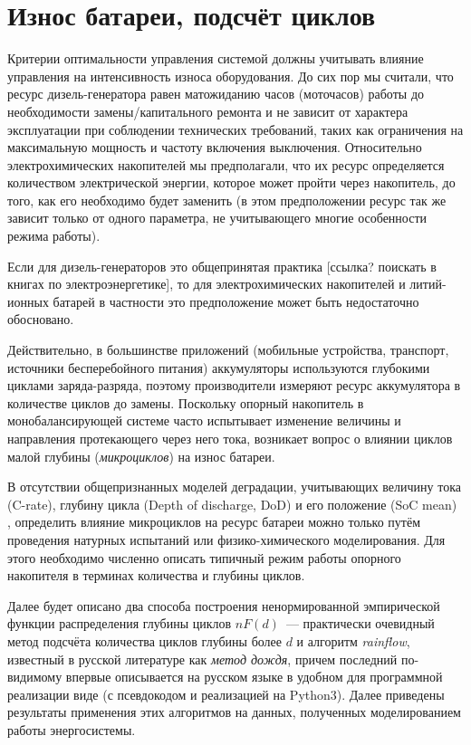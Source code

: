 \documentclass{report}
\begin{document}
\section{Износ батареи, подсчёт циклов}

Критерии оптимальности управления системой должны учитывать влияние управления на интенсивность износа оборудования.
До сих пор мы считали, что ресурс дизель-генератора равен матожиданию часов (моточасов) работы до необходимости замены/капитального ремонта и не зависит от характера эксплуатации при соблюдении технических требований, таких как ограничения на максимальную мощность и частоту включения выключения.
Относительно электрохимических накопителей мы предполагали, что их ресурс определяется количеством электрической энергии, которое может пройти через накопитель, до того, как его необходимо будет заменить (в этом предположении ресурс так же зависит только от одного параметра, не учитывающего многие особенности режима работы).

Если для дизель-генераторов это общепринятая практика [ссылка? поискать в книгах по электроэнергетике], то для электрохимических накопителей и литий-ионных батарей в частности это предположение может быть недостаточно обосновано.

Действительно, в большинстве приложений (мобильные устройства, транспорт, источники бесперебойного питания) аккумуляторы используются глубокими циклами заряда-разряда, поэтому производители измеряют ресурс аккумулятора в количестве циклов до замены. 
Поскольку опорный накопитель в монобалансирующей системе часто испытывает изменение величины и направления протекающего через него тока, возникает вопрос о влиянии циклов малой глубины (\textit{микроциклов}) на износ батареи.

В отсутствии общепризнанных моделей деградации, учитывающих величину тока (C-rate), глубину цикла (Depth of discharge, DoD) и его положение (SoC mean) \cite{laresgoiti2015modeling}, определить влияние микроциклов на ресурс батареи можно только путём проведения натурных испытаний или физико-химического моделирования. 
Для этого необходимо численно описать типичный режим работы опорного накопителя в терминах количества и глубины циклов.

Далее будет описано два способа построения ненормированной эмпирической функции распределения глубины циклов $nF(d)$~--- практически очевидный метод подсчёта количества циклов глубины более $d$ и алгоритм \textit{rainflow}, известный в русской литературе как \textit{метод дождя}, причем последний по-видимому впервые описывается на русском языке в удобном для программной реализации виде (с псевдокодом и реализацией на Python3).
Далее приведены результаты применения этих алгоритмов на данных, полученных моделированием работы энергосистемы.
\end{document}
